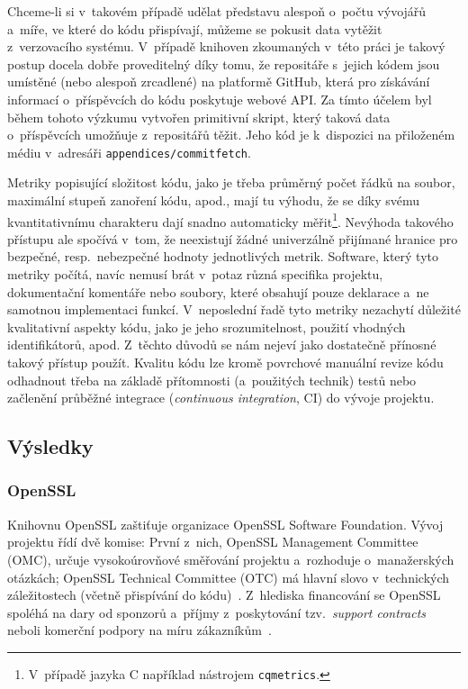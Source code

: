 Chceme-li si v~takovém případě udělat představu alespoň o~počtu vývojářů a~míře, ve které do kódu přispívají, můžeme se pokusit data vytěžit z~verzovacího systému. V~případě knihoven zkoumaných v~této práci je takový postup docela dobře proveditelný díky tomu, že repositáře s~jejich kódem jsou umístěné (nebo alespoň zrcadlené) na platformě GitHub, která pro získávání informací o~příspěvcích do kódu poskytuje webové API. Za tímto účelem byl během tohoto výzkumu vytvořen primitivní skript, který taková data o~příspěvcích umožňuje z~repositářů těžit. Jeho kód je k~dispozici na přiloženém médiu v~adresáři \texttt{appendices/commitfetch}.

Metriky popisující složitost kódu, jako je třeba průměrný počet řádků na soubor, maximální stupeň zanoření kódu, apod., mají tu výhodu, že se díky svému kvantitativnímu charakteru dají snadno automaticky měřit\footnote{V~případě jazyka C například nástrojem \texttt{cqmetrics}.}. Nevýhoda takového přístupu ale spočívá v~tom, že neexistují žádné univerzálně přijímané hranice pro bezpečné, resp.\ nebezpečné hodnoty jednotlivých metrik. Software, který tyto metriky počítá, navíc nemusí brát v~potaz různá specifika projektu, dokumentační komentáře nebo soubory, které obsahují pouze deklarace a~ne samotnou implementaci funkcí. V~neposlední řadě tyto metriky nezachytí důležité kvalitativní aspekty kódu, jako je jeho srozumitelnost, použití vhodných identifikátorů, apod. Z~těchto důvodů se nám nejeví jako dostatečně přínosné takový přístup použít. Kvalitu kódu lze kromě povrchové manuální revize kódu odhadnout třeba na základě přítomnosti (a~použitých technik) testů nebo začlenění průběžné integrace (\textit{continuous integration}, CI) do vývoje projektu.

\subsection{Výsledky}

\subsubsection*{OpenSSL}

Knihovnu OpenSSL zaštiťuje organizace OpenSSL Software Foundation. Vývoj projektu řídí dvě komise: První z~nich, Open\-SSL Management Committee (OMC), určuje vy\-so\-ko\-ú\-rov\-ňo\-vé směřování projektu a~rozhoduje o~ma\-na\-žer\-ských otázkách; Open\-SSL Technical Committee (OTC) má hlavní slovo v~technických zá\-le\-ži\-tos\-tech (včetně přispívání do kódu)~\cite{openssl-bylaws}. Z~hlediska financování se OpenSSL spoléhá na dary od sponzorů a~příjmy z~poskytování tzv.~\textit{support contracts} neboli komerční podpory na míru zákazníkům~\cite{openssl-donations}.


